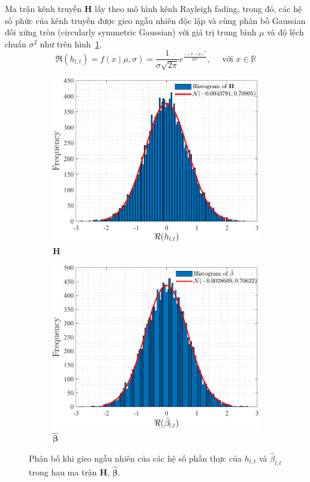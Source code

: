Ma trận kênh truyền $\mathbf{H}$ lấy theo mô hình kênh Rayleigh fading, trong đó, các hệ số phức của kênh truyền được gieo ngẫu nhiên độc lập và cùng phân bố Gaussian đối xứng tròn (circularly symmetric Gaussian) với giá trị trung bình $\mu$ và độ lệch chuẩn $\sigma^2$ như trên hình~\ref{fig:ray_H}.
\begin{equation}
\Re(h_{l, t})=f(x \mid \mu, \sigma)=\frac{1}{\sigma \sqrt{2 \pi}} e^{\frac{-(x-\mu)^2}{2 \sigma^2}}, \quad \text { với } x \in \mathbb{R}
\end{equation}
\begin{figure}
    \centering
    \begin{subfigure}{.48\linewidth}
        \includegraphics[width=\linewidth]{figures/H.pdf}
        \caption{$\mathbf{H}$}
        \label{fig:ray_H}
    \end{subfigure}
    \hfill
    \begin{subfigure}{.48\linewidth}
        \includegraphics[width=\linewidth]{figures/Beta.pdf}
        \caption{$\hat{\boldsymbol{\beta}}$}
        \label{fig:ray_Beta}
    \end{subfigure}
    \caption{Phân bố khi gieo ngẫu nhiên của các hệ số phần thực của $h_{l, t}$ và $ \hat{\beta}_{l, t}$ trong hau ma trận $\mathbf{H}$, $\hat{\boldsymbol{\beta}}$.}
    \label{fig:ray}
\end{figure}

